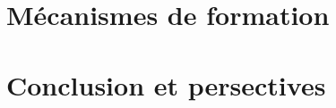 \documentclass[logos,chaptertoc]{bordeaux-thesis}
\begin{document}
\chapter{Mécanismes de formation}\label{sec:chap4}



\chapter{Conclusion et persectives}\label{sec:discussion}



\adjustmtc %


\appendix








\end{document}
